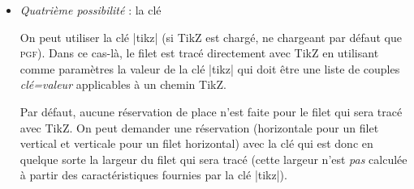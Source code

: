 \documentclass[dvipsnames]{article}
\begin{document}
\begin{itemize}[beginpenalty=10000]
\bigskip
Il est donc possible d'utiliser les commandes |\hdottedline| et |\cdottedline|
pour tracer des filets horizontaux en pointillés.

\smallskip
\begin{Code}[width=9.5cm,show-output,no-cell-nodes]
$\begin{pNiceMatrix}
1 & 2 & 3 & 4 & 5 \\
\emph{\hdottedline}
6 & 7 & 8 & 9 & 10 \\
\emph{\cdottedline{1,4-5}}
11 & 12 & 13 & 14 & 15
\end{pNiceMatrix}$
\end{Code}

\medskip
Dans les environnements avec un préambule explicite (comme |{NiceTabular}|,
|{NiceArray}|, etc.), il est possible de dessiner un trait vertical en
pointillés avec le spécificateur «|:|».

\medskip
\begin{Code}[width=9.5cm,show-output,no-cell-nodes]
$\begin{pNiceArray}{cccc\emph{:}c}
1 & 2 & 3 & 4 & 5 \\
6 & 7 & 8 & 9 & 10 \\
11 & 12 & 13 & 14 & 15
\end{pNiceArray}$
\end{Code}

\medskip
Comme précédemment avec la clé |dashed|, on peut utiliser la clé |total-width|
en conjonction avec la clé |dotted|.


\bigskip
\item \emph{Quatrième possibilité} : la clé 


\nobreak
On peut utiliser la clé |tikz| (si TikZ est chargé,  ne
chargeant par défaut que \textsc{pgf}). Dans ce cas-là, le filet est tracé
directement avec TikZ en utilisant comme paramètres la valeur de la clé |tikz|
qui doit être une liste de couples \textsl{clé=valeur} applicables à un chemin
TikZ.

Par défaut, aucune réservation de place n'est faite pour le filet qui sera tracé
avec TikZ. On peut demander une réservation (horizontale pour un filet vertical
et verticale pour un filet horizontal) avec la clé  qui
est donc en quelque sorte la largeur du filet qui sera tracé (cette largeur
n'est \emph{pas} calculée à partir des caractéristiques fournies par la clé
|tikz|).


\end{itemize}
\end{document}
